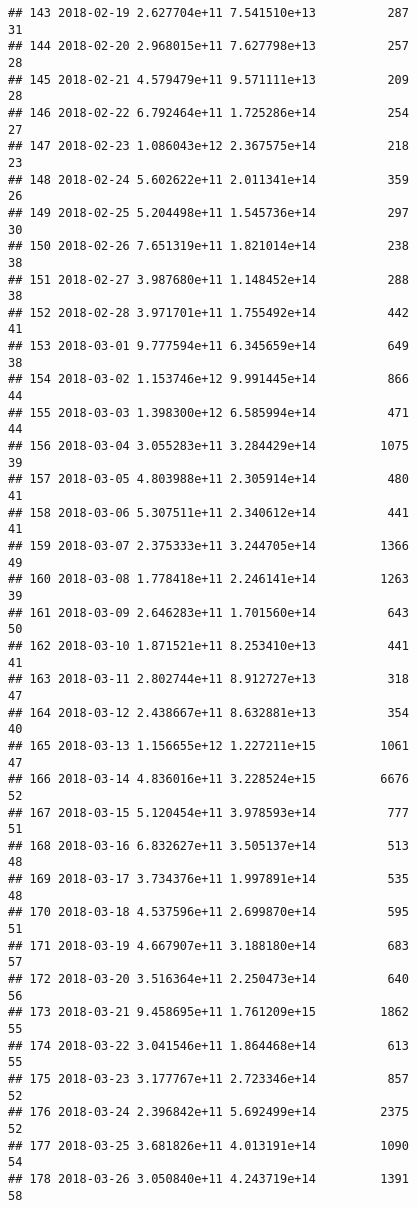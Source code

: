 \documentclass[]{article}
\begin{document}
\begin{verbatim}
## 143 2018-02-19 2.627704e+11 7.541510e+13          287              31
## 144 2018-02-20 2.968015e+11 7.627798e+13          257              28
## 145 2018-02-21 4.579479e+11 9.571111e+13          209              28
## 146 2018-02-22 6.792464e+11 1.725286e+14          254              27
## 147 2018-02-23 1.086043e+12 2.367575e+14          218              23
## 148 2018-02-24 5.602622e+11 2.011341e+14          359              26
## 149 2018-02-25 5.204498e+11 1.545736e+14          297              30
## 150 2018-02-26 7.651319e+11 1.821014e+14          238              38
## 151 2018-02-27 3.987680e+11 1.148452e+14          288              38
## 152 2018-02-28 3.971701e+11 1.755492e+14          442              41
## 153 2018-03-01 9.777594e+11 6.345659e+14          649              38
## 154 2018-03-02 1.153746e+12 9.991445e+14          866              44
## 155 2018-03-03 1.398300e+12 6.585994e+14          471              44
## 156 2018-03-04 3.055283e+11 3.284429e+14         1075              39
## 157 2018-03-05 4.803988e+11 2.305914e+14          480              41
## 158 2018-03-06 5.307511e+11 2.340612e+14          441              41
## 159 2018-03-07 2.375333e+11 3.244705e+14         1366              49
## 160 2018-03-08 1.778418e+11 2.246141e+14         1263              39
## 161 2018-03-09 2.646283e+11 1.701560e+14          643              50
## 162 2018-03-10 1.871521e+11 8.253410e+13          441              41
## 163 2018-03-11 2.802744e+11 8.912727e+13          318              47
## 164 2018-03-12 2.438667e+11 8.632881e+13          354              40
## 165 2018-03-13 1.156655e+12 1.227211e+15         1061              47
## 166 2018-03-14 4.836016e+11 3.228524e+15         6676              52
## 167 2018-03-15 5.120454e+11 3.978593e+14          777              51
## 168 2018-03-16 6.832627e+11 3.505137e+14          513              48
## 169 2018-03-17 3.734376e+11 1.997891e+14          535              48
## 170 2018-03-18 4.537596e+11 2.699870e+14          595              51
## 171 2018-03-19 4.667907e+11 3.188180e+14          683              57
## 172 2018-03-20 3.516364e+11 2.250473e+14          640              56
## 173 2018-03-21 9.458695e+11 1.761209e+15         1862              55
## 174 2018-03-22 3.041546e+11 1.864468e+14          613              55
## 175 2018-03-23 3.177767e+11 2.723346e+14          857              52
## 176 2018-03-24 2.396842e+11 5.692499e+14         2375              52
## 177 2018-03-25 3.681826e+11 4.013191e+14         1090              54
## 178 2018-03-26 3.050840e+11 4.243719e+14         1391              58

\end{verbatim}
\end{document}
